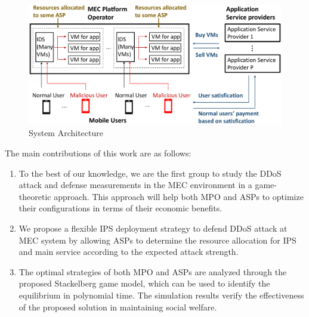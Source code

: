 \documentclass[conference]{IEEEtran}
\begin{document}
\begin{figure}[t]
\centering
\includegraphics[width= 0.8\columnwidth]{5GDDoS_Game_system_architecture.pdf}
\caption{System Architecture}
\vspace{-0.6em}
\label{fig:system}
\end{figure}


The main contributions of this work are as follows:
\begin{enumerate}
    \item To the best of our knowledge, we are the first group to study the DDoS attack and defense measurements in the MEC environment in a game-theoretic approach. This approach will help both MPO and ASPs to optimize their configurations in terms of their economic benefits.
    \item We propose a flexible IPS deployment strategy to defend DDoS attack at MEC system by allowing ASPs to determine the resource allocation for IPS and main service according to the expected attack strength. 
    \item The optimal strategies of both MPO and ASPs are analyzed through the proposed Stackelberg game model, which can be used to identify the equilibrium in polynomial time. The simulation results verify the effectiveness of the proposed solution in maintaining social welfare. 
\end{enumerate}
\end{document}
